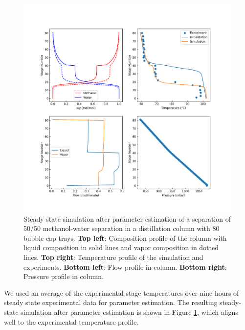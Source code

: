 \begin{figure}
    \centering
    \includegraphics[width=\textwidth]{gfx/Chapter06/2021_11_17_steady_state_estimated.png}
    \caption{Steady state simulation after parameter estimation of a separation of 50/50 methanol-water separation in a distillation column with 80 bubble cap trays. \textbf{Top left}: Composition profile of the column with liquid composition in solid lines and vapor composition in dotted lines. \textbf{Top right}: Temperature profile of the simulation and experiments. \textbf{Bottom left}: Flow profile in column. \textbf{Bottom right}: Pressure profile in column.  }
    \label{fig:estimated}
\end{figure}

We used an average of the experimental stage temperatures over nine hours of steady state experimental data for parameter estimation. The resulting steady-state simulation after parameter estimation is shown in Figure \ref{fig:estimated}, which aligns well to the experimental temperature profile.  

